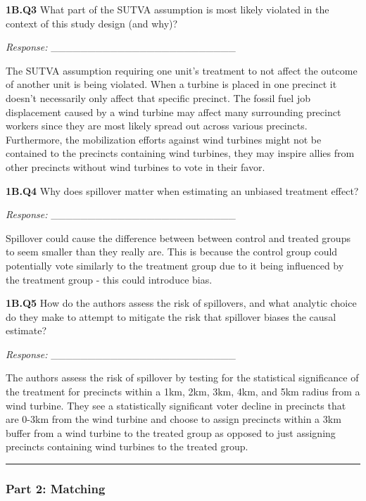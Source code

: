 \documentclass[
  letterpaper,
  DIV=11,
  numbers=noendperiod]{scrartcl}
\begin{document}
\textbf{1B.Q3} What part of the SUTVA assumption is most likely violated
in the context of this study design (and why)?

\emph{Response:} \_\_\_\_\_\_\_\_\_\_\_\_\_\_\_\_\_\_\_\_\_\_\_\_\_

The SUTVA assumption requiring one unit's treatment to not affect the
outcome of another unit is being violated. When a turbine is placed in
one precinct it doesn't necessarily only affect that specific precinct.
The fossil fuel job displacement caused by a wind turbine may affect
many surrounding precinct workers since they are most likely spread out
across various precincts. Furthermore, the mobilization efforts against
wind turbines might not be contained to the precincts containing wind
turbines, they may inspire allies from other precincts without wind
turbines to vote in their favor.

\textbf{1B.Q4} Why does spillover matter when estimating an unbiased
treatment effect?

\emph{Response:} \_\_\_\_\_\_\_\_\_\_\_\_\_\_\_\_\_\_\_\_\_\_\_\_\_

Spillover could cause the difference between between control and treated
groups to seem smaller than they really are. This is because the control
group could potentially vote similarly to the treatment group due to it
being influenced by the treatment group - this could introduce bias.

\textbf{1B.Q5} How do the authors assess the risk of spillovers, and
what analytic choice do they make to attempt to mitigate the risk that
spillover biases the causal estimate?

\emph{Response:} \_\_\_\_\_\_\_\_\_\_\_\_\_\_\_\_\_\_\_\_\_\_\_\_\_

The authors assess the risk of spillover by testing for the statistical
significance of the treatment for precincts within a 1km, 2km, 3km, 4km,
and 5km radius from a wind turbine. They see a statistically significant
voter decline in precincts that are 0-3km from the wind turbine and
choose to assign precincts within a 3km buffer from a wind turbine to
the treated group as opposed to just assigning precincts containing wind
turbines to the treated group.

\begin{center}\rule{0.5\linewidth}{0.5pt}\end{center}

\subsubsection{Part 2: Matching}\label{part-2-matching}
\end{document}
